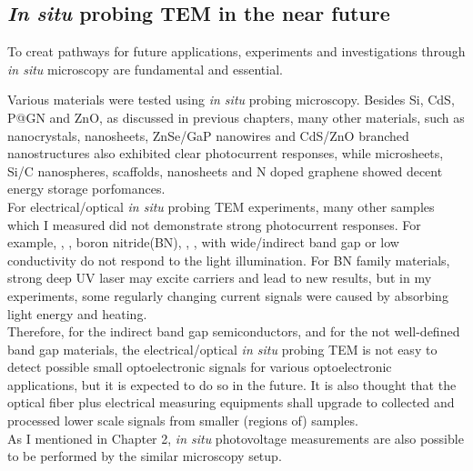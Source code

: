 
\subsection{\textit{In situ} probing TEM in the near future}
To creat pathways for future applications, experiments and investigations through \textit{in situ} microscopy are fundamental and essential. 

Various materials were tested using \textit{in situ} probing microscopy. Besides Si, CdS, P@GN and ZnO, as discussed in previous chapters, many other materials, such as  nanocrystals,  nanosheets, ZnSe/GaP nanowires and CdS/ZnO branched nanostructures also exhibited clear photocurrent responses, while  microsheets, Si/C nanospheres,  scaffolds,  nanosheets and N doped graphene showed decent energy storage porfomances.\\

For electrical/optical \textit{in situ} probing TEM experiments, many other samples which I measured did not demonstrate strong photocurrent responses. For example, , , boron nitride(BN), , ,  with wide/indirect band gap or low conductivity do not respond to the light illumination. For BN family materials, strong deep UV laser may excite carriers and lead to new results, but in my experiments, some regularly changing current signals were caused by absorbing light energy and heating. \\

Therefore, for the indirect band gap semiconductors, and for the not well-defined band gap materials, the electrical/optical \textit{in situ} probing TEM is not easy to detect possible small optoelectronic signals for various optoelectronic applications, but it is expected to do so in the future. It is also thought that the optical fiber plus electrical measuring equipments shall upgrade to collected and processed lower scale signals from smaller (regions of) samples. \\

As I mentioned in Chapter 2, \textit{in situ} photovoltage measurements are also possible to be performed by the similar microscopy setup. 

